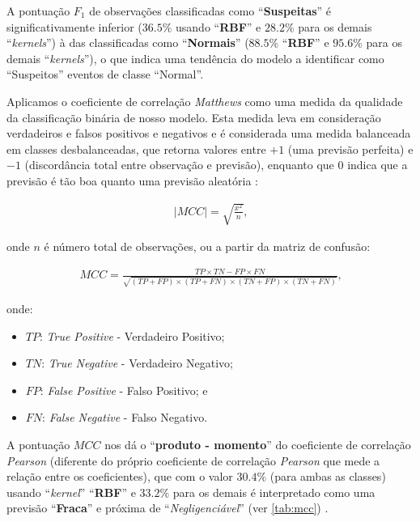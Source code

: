 \documentclass[twoside]{article}
\begin{document}
A pontuação $F_1$ de observações classificadas como ``\textbf{Suspeitas}'' é significativamente inferior ($36.5\%$ usando ``\textbf{RBF}'' e $28.2\%$ para os demais ``\textit{kernels}'') à das classificadas como ``\textbf{Normais}'' ($88.5\%$ ``\textbf{RBF}'' e $95.6\%$ para os demais ``\textit{kernels}''), o que indica uma tendência do modelo a identificar como ``Suspeitos'' eventos de classe ``Normal''.

Aplicamos o coeficiente de correlação \textit{Matthews} como uma medida da qualidade da classificação binária de nosso modelo. Esta medida leva em consideração verdadeiros e falsos positivos e negativos e é considerada uma medida balanceada em classes desbalanceadas, que retorna valores entre $+1$ (uma previsão perfeita) e $-1$ (discordância total entre observação e previsão), enquanto que $0$ indica que a previsão é tão boa quanto uma previsão aleatória \cite{matthews1975comparison}:

\begin{align*}
    | MCC | = \sqrt{\frac{x^2}{n}} \text{,}
\end{align*}

\noindent onde $n$ é número total de observações, ou a partir da matriz de confusão:

\begin{align*}
    MCC = \frac{TP \times TN - FP \times FN}{\sqrt{(TP + FP) \times (TP + FN) \times (TN + FP) \times (TN + FN)}} \text{,}
\end{align*}

\noindent onde:

\begin{itemize}
    \item $TP$: \textit{True Positive} - Verdadeiro Positivo;
    \item $TN$: \textit{True Negative} - Verdadeiro Negativo;
    \item $FP$: \textit{False Positive} - Falso Positivo; e
    \item $FN$: \textit{False Negative} - Falso Negativo.
\end{itemize}

A pontuação $MCC$ nos dá o ``\textbf{produto - momento}'' do coeficiente de correlação \textit{Pearson} (diferente do próprio coeficiente de correlação \textit{Pearson} que mede a relação entre os coeficientes), que com o valor $30.4\%$ (para ambas as classes) usando ``\textit{kernel}'' ``\textbf{RBF}'' e $33.2\%$ para os demais é interpretado como uma previsão ``\textbf{Fraca}'' e próxima de ``\textit{Negligenciável}'' (ver \cref{tab:mcc}) \cite{powers2020evaluation}.
\end{document}
